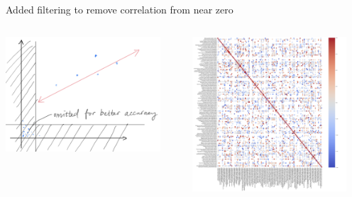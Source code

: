 \begin{frame}{Added filtering to remove correlation from near zero}
    \begin{columns}
        \begin{column}{0.5\textwidth}
            \centering
            \includegraphics[height=0.9\textheight,width=0.9\textwidth,keepaspectratio]{images/conf_filter_explanation.jpeg}
        \end{column}
        \begin{column}{0.5\textwidth}
            \centering
            \includegraphics[height=0.9\textheight,width=0.9\textwidth,keepaspectratio]{images/confidence_filter.png}
        \end{column}
    \end{columns}
\end{frame}


